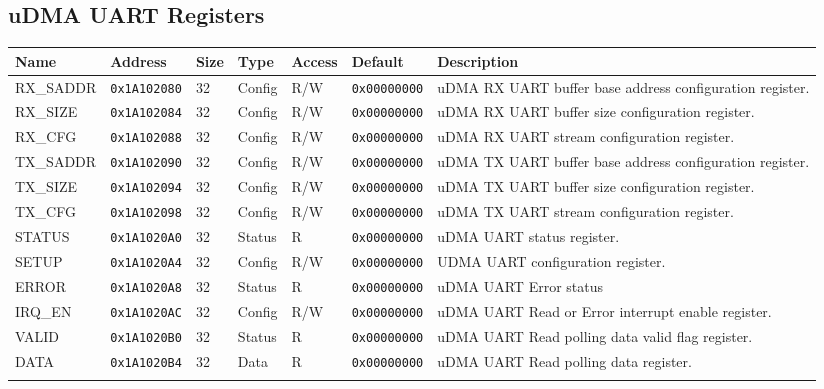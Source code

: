 
\subsection{uDMA UART Registers}
{\small
\begin{tabularx}{\textwidth}{|l|l|l|l|l|l|X|}
  \hline
  \textbf{Name} & \textbf{Address}  & \textbf{Size} & \textbf{Type} & \textbf{Access} & \textbf{Default} & \textbf{Description} \\
  \hline
  RX\_SADDR & \texttt{0x1A102080} & 32 & Config & R/W & \texttt{0x00000000} & uDMA RX UART buffer base address configuration register.\\
  \hline
  RX\_SIZE & \texttt{0x1A102084} & 32 & Config & R/W & \texttt{0x00000000} & uDMA RX UART buffer size configuration register.\\
  \hline
  RX\_CFG & \texttt{0x1A102088} & 32 & Config & R/W & \texttt{0x00000000} & uDMA RX UART stream configuration register.\\
  \hline
  TX\_SADDR & \texttt{0x1A102090} & 32 & Config & R/W & \texttt{0x00000000} & uDMA TX UART buffer base address configuration register.\\
  \hline
  TX\_SIZE & \texttt{0x1A102094} & 32 & Config & R/W & \texttt{0x00000000} & uDMA TX UART buffer size configuration register.\\
  \hline
  TX\_CFG & \texttt{0x1A102098} & 32 & Config & R/W & \texttt{0x00000000} & uDMA TX UART stream configuration register.\\
  \hline
  STATUS & \texttt{0x1A1020A0} & 32 & Status & R & \texttt{0x00000000} & uDMA UART status register.\\
  \hline
  SETUP & \texttt{0x1A1020A4} & 32 & Config & R/W & \texttt{0x00000000} & UDMA UART configuration register.\\
  \hline
  ERROR & \texttt{0x1A1020A8} & 32 & Status & R & \texttt{0x00000000} & uDMA UART Error status\\
  \hline
  IRQ\_EN & \texttt{0x1A1020AC} & 32 & Config & R/W & \texttt{0x00000000} & uDMA UART Read or Error interrupt enable register.\\
  \hline
  VALID & \texttt{0x1A1020B0} & 32 & Status & R & \texttt{0x00000000} & uDMA UART Read polling data valid flag register.\\
  \hline
  DATA & \texttt{0x1A1020B4} & 32 & Data & R & \texttt{0x00000000} & uDMA UART Read polling data register.\\
  \hline
  \caption{uDMA UART}
\end{tabularx}
}


